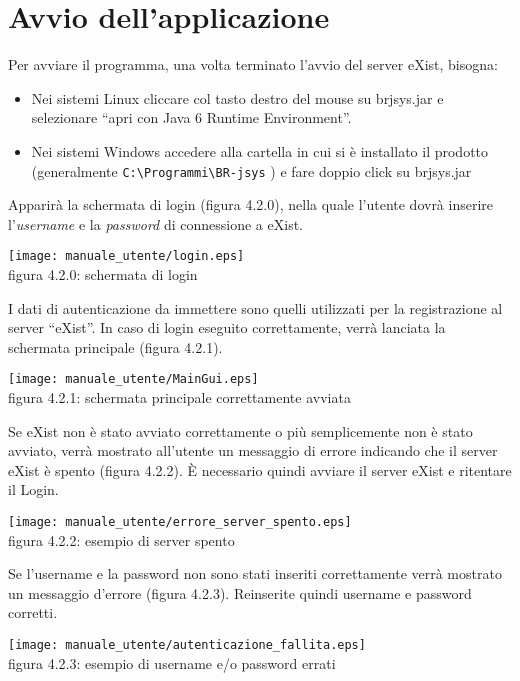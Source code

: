 \section{Avvio dell'applicazione}
Per avviare il programma, una volta terminato l'avvio del server eXist, bisogna:
\begin{itemize}
 \item Nei sistemi Linux cliccare col tasto destro del mouse su brjsys.jar e selezionare ``apri con Java 6 Runtime Environment''.
\item Nei sistemi Windows accedere alla cartella in cui si \`e installato il prodotto (generalmente \texttt{C:\textbackslash Programmi\textbackslash BR-jsys} ) e fare doppio click su brjsys.jar 
\end{itemize}
Apparir\`a la schermata di login (figura 4.2.0), nella quale l'utente dovr\`a inserire l'\textit{username} e la \textit{password} di connessione a eXist.
\begin{center}
\texttt{[image: manuale\_utente/login.eps]}\\
 figura 4.2.0: schermata di login
\end{center}
I dati di autenticazione da immettere sono quelli utilizzati per la registrazione al server ``eXist''.
In caso di login eseguito correttamente, verr\`a lanciata la schermata principale (figura 4.2.1).
\begin{center}
\texttt{[image: manuale\_utente/MainGui.eps]}\\
 figura 4.2.1: schermata principale correttamente avviata
\end{center}
Se eXist non \`e stato avviato correttamente o pi\`u semplicemente non \`e stato avviato, verr\`a mostrato all'utente un messaggio di errore indicando che il server eXist \`e spento (figura 4.2.2). \`E necessario quindi avviare il server eXist e ritentare il Login.
\begin{center}
\texttt{[image: manuale\_utente/errore\_server\_spento.eps]}\\
 figura 4.2.2: esempio di server spento
\end{center} 
Se l'username e la password non sono stati inseriti correttamente verr\`a mostrato un messaggio d'errore (figura 4.2.3). Reinserite quindi username e password corretti.
\begin{center}
\texttt{[image: manuale\_utente/autenticazione\_fallita.eps]}\\
figura 4.2.3: esempio di username e/o password errati
\end{center}

